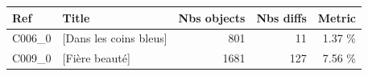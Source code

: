 \begin{small}
\begin{tabular}{l|l|r|r|r}
\textbf{Ref} & \textbf{Title} & \textbf{Nbs objects} &  \textbf{Nbs diffs} & \textbf{Metric} \\ \hline
	C006\_0 & [Dans les coins bleus]  & 801 & 11 & 1.37 \% \\ 
		C009\_0 & [Fière beauté]  & 1681 & 127 & 7.56 \% \\ 
		\hline
\end{tabular}
\end{small}
	